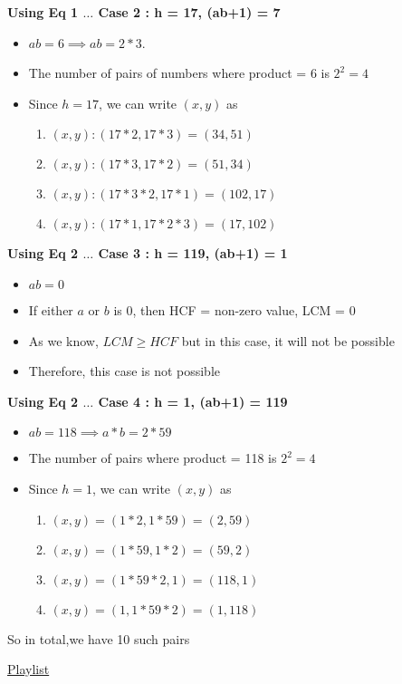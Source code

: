 \textbf{Using Eq 1 $\ldots$ Case 2 : h = 17, (ab+1) = 7}
\begin{itemize}
    \item $ab = 6 \implies ab = 2 * 3$.
    \item The number of pairs of numbers where product = 6 is $2^2 = 4$
    \item Since $h = 17$, we can write $(x,y)$ as
    \begin{enumerate}
        \item $(x,y) : (17 * 2, 17 * 3) = (34,51)$
        \item $(x,y) : (17 * 3, 17 * 2) = (51,34)$
        \item $(x,y) : (17 * 3 * 2, 17 * 1) = (102,17)$
        \item $(x,y) : (17 * 1, 17 * 2 * 3) = (17,102)$
    \end{enumerate}
\end{itemize}

\textbf{Using Eq 2 $\ldots$ Case 3 : h = 119, (ab+1) = 1}
\begin{itemize}
    \item $ab = 0$
    \item If either $a$ or $b$ is 0, then HCF = non-zero value, LCM = 0
    \item As we know, $LCM \geq HCF$ but in this case, it will not be possible
    \item Therefore, this case is not possible
\end{itemize}

\textbf{Using Eq 2 $\ldots$ Case 4 : h = 1, (ab+1) = 119}
\begin{itemize}
    \item $ab = 118 \implies a*b = 2 * 59$
    \item The number of pairs where product = 118 is $2^2 = 4$
    \item Since $h = 1$, we can write $(x,y)$ as 
    \begin{enumerate}
        \item $(x,y) = (1 * 2, 1 * 59) = (2,59)$
        \item $(x,y) = (1 * 59, 1 * 2) = (59,2)$
        \item $(x,y) = (1 * 59 * 2, 1) = (118,1)$
        \item $(x,y) = (1,1 * 59 * 2) = (1,118)$
    \end{enumerate}
\end{itemize}

So in total,we have 10 such pairs


\href{https://www.youtube.com/watch?v=JyN6EROdhrw&list=PLG4bwc5fquzgmP5BLHrRDwBueer0udDjc&index=38}{Playlist}